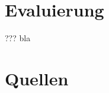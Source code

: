 \section{Evaluierung}
\begin{frame}[t,fragile]{???}
	bla
\end{frame}

\nocite{*}
\section*{Quellen}
\begin{frame}[allowframebreaks,t]{\secname}
	\printbibliography
\end{frame}